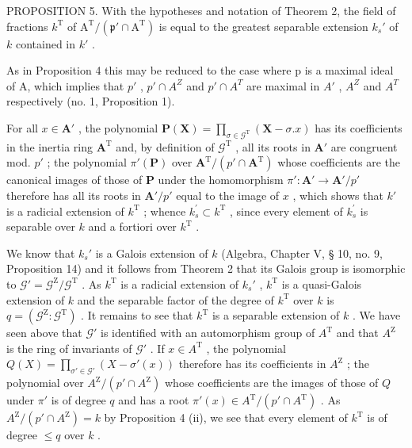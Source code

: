 PROPOSITION 5. With the hypotheses and notation of Theorem 2, the field of fractions \(k^{\mathrm{T}}\) of \(\mathrm{A}^{\mathrm{T}} / (\mathfrak{p}' \cap \mathrm{A}^{\mathrm{T}})\) is equal to the greatest separable extension \(k_s'\) of \(k\) contained in \(k'\) .

As in Proposition 4 this may be reduced to the case where p is a maximal ideal of A, which implies that \(p'\) , \(p' \cap A^{Z}\) and \(p' \cap A^{T}\) are maximal in \(A'\) , \(A^{Z}\) and \(A^{T}\) respectively (no. 1, Proposition 1).

For all \(x \in \mathbf{A}'\) , the polynomial \(\mathbf{P}(\mathbf{X}) = \prod_{\sigma \in \mathcal{G}^{\mathrm{T}}} (\mathbf{X} - \sigma.x)\) has its coefficients in the inertia ring \(\mathbf{A}^{\mathrm{T}}\) and, by definition of \(\mathcal{G}^{\mathrm{T}}\) , all its roots in \(\mathbf{A}'\) are congruent mod. \(p'\) ; the polynomial \(\pi'(\mathbf{P})\) over \(\mathbf{A}^{\mathrm{T}} / (p' \cap \mathbf{A}^{\mathrm{T}})\) whose coefficients are the canonical images of those of \(\mathbf{P}\) under the homomorphism \(\pi': \mathbf{A}' \to \mathbf{A}' / p'\) therefore has all its roots in \(\mathbf{A}' / p'\) equal to the image of \(x\) , which shows that \(k'\) is a radicial extension of \(k^{\mathrm{T}}\) ; whence \(k_{s}^{\prime} \subset k^{\mathrm{T}}\) , since every element of \(k_{s}^{\prime}\) is separable over \(k\) and a fortiori over \(k^{\mathrm{T}}\) .

We know that \(k_s'\) is a Galois extension of \(k\) (Algebra, Chapter V, § 10, no. 9, Proposition 14) and it follows from Theorem 2 that its Galois group is isomorphic to \(\mathcal{G}' = \mathcal{G}^{\mathrm{Z}} / \mathcal{G}^{\mathrm{T}}\) . As \(k^{\mathrm{T}}\) is a radicial extension of \(k_s'\) , \(k^{\mathrm{T}}\) is a quasi-Galois extension of \(k\) and the separable factor of the degree of \(k^{\mathrm{T}}\) over \(k\) is \(q = (\mathcal{G}^{\mathrm{Z}}: \mathcal{G}^{\mathrm{T}})\) . It remains to see that \(k^{\mathrm{T}}\) is a separable extension of \(k\) . We have seen above that \(\mathcal{G}'\) is identified with an automorphism group of \(A^{\mathrm{T}}\) and that \(A^{\mathrm{Z}}\) is the ring of invariants of \(\mathcal{G}'\) . If \(x \in A^{\mathrm{T}}\) , the polynomial \(Q(X) = \prod_{\sigma' \in \mathcal{G}'} (X - \sigma'(x))\) therefore has its coefficients in \(A^{\mathrm{Z}}\) ; the polynomial over \(A^{\mathrm{Z}} / (p' \cap A^{\mathrm{Z}})\) whose coefficients are the images of those of \(Q\) under \(\pi'\) is of degree \(q\) and has a root \(\pi'(x) \in A^{\mathrm{T}} / (p' \cap A^{\mathrm{T}})\) . As \(A^{\mathrm{Z}} / (p' \cap A^{\mathrm{Z}}) = k\) by Proposition 4 (ii), we see that every element of \(k^{\mathrm{T}}\) is of degree \(\leqslant q\) over \(k\) .

